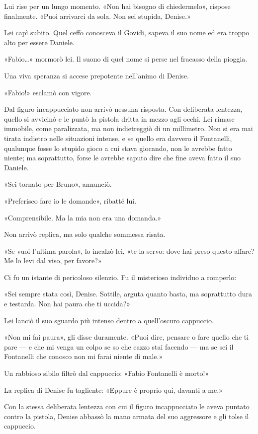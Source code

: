 Lui rise per un lungo momento. «Non hai bisogno di chiedermelo», rispose finalmente. «Puoi arrivarci da sola. Non sei stupida, Denise.»

Lei capì subito. Quel ceffo conosceva il Govidi, sapeva il suo nome ed era troppo alto per essere Daniele.

«Fabio\ldots» mormorò lei. Il suono di quel nome si perse nel fracasso della pioggia.

Una viva speranza si accese prepotente nell'animo di Denise.

«Fabio!» esclamò con vigore.

Dal figuro incappucciato non arrivò nessuna risposta. Con deliberata lentezza, quello si avvicinò e le puntò la pistola dritta in mezzo agli occhi. Lei rimase immobile, come paralizzata, ma non indietreggiò di un millimetro. Non si era mai tirata indietro nelle situazioni intense, e se quello era davvero il Fontanelli, qualunque fosse lo stupido gioco a cui stava giocando, non le avrebbe fatto niente; ma soprattutto, forse le avrebbe saputo dire che fine aveva fatto il suo Daniele.

«Sei tornato per Bruno», annunciò.

«Preferisco fare io le domande», ribatté lui.

«Comprensibile. Ma la mia non era una domanda.»

Non arrivò replica, ma solo qualche sommessa risata.

«Se vuoi l'ultima parola», lo incalzò lei, «te la servo: dove hai preso questo affare? Me lo levi dal viso, per favore?»

Ci fu un istante di pericoloso silenzio. Fu il misterioso individuo a romperlo:

«Sei sempre stata così, Denise. Sottile, arguta quanto basta, ma soprattutto dura e testarda. Non hai paura che ti uccida?»

Lei lanciò il suo sguardo più intenso dentro a quell'oscuro cappuccio.

«Non mi fai paura», gli disse duramente. «Puoi dire, pensare o fare quello che ti pare --- e che mi venga un colpo se so che cazzo stai facendo --- ma se sei il Fontanelli che conosco non mi farai niente di male.»

Un rabbioso sibilo filtrò dal cappuccio: «Fabio Fontanelli è morto!»

La replica di Denise fu tagliente: «Eppure è proprio qui, davanti a me.»

Con la stessa deliberata lentezza con cui il figuro incappucciato le aveva puntato contro la pistola, Denise abbassò la mano armata del suo aggressore e gli tolse il cappuccio.

